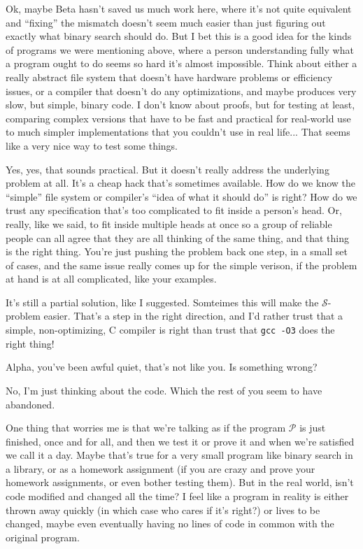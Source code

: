 \documentclass[sigplan]{acmart}
\begin{document}
  Ok, maybe Beta hasn't saved us much
work here, where it's not quite equivalent and ``fixing'' the mismatch
doesn't seem much easier than just figuring out exactly what binary
search should do.  But I bet this is a good idea for the kinds of
programs we were mentioning above, where a person understanding fully
what a program ought to do seems so hard it's almost impossible.
Think about either a really abstract file system that doesn't have
hardware problems or efficiency issues, or a compiler that doesn't do
any optimizations, and maybe produces very slow, but simple, binary
code.  I don't know about proofs, but for testing at least, comparing
complex versions that have to be fast and practical for real-world use
to much simpler implementations that you couldn't use in real life...
That seems like a very nice way to test some things.

  Yes, yes, that sounds practical.  But it
doesn't really address the underlying problem at all.  It's a cheap
hack that's sometimes available. How do we know the ``simple''
file system or compiler's ``idea of what it should do'' is right?  How
do we trust any specification that's too complicated to fit inside a
person's head.  Or, really, like we said, to fit inside multiple heads
at once so a group of reliable people can all agree that they are all
thinking of the same thing, and that thing is the right thing.  You're
just pushing the problem back one step, in a small set of cases, and
the same issue really comes up for the simple verison, if the problem
at hand is at all complicated, like your examples.

   It's still a partial solution, like I
suggested. Somteimes this will make the $\mathcal{S}$-problem easier.
That's a step in the right direction, and I'd rather trust that a
simple, non-optimizing, C compiler is right than trust that {\tt gcc
  -O3} does the right thing!

  Alpha, you've been awful quiet, that's not
like you. Is something wrong?

  No, I'm just thinking about the code.
Which the rest of you seem to have abandoned.

  One thing that worries me is that we're
talking as if the program  $\mathcal{P}$ is just finished, once and
for all, and then we test it or prove it and when we're satisfied we
call it a day.  Maybe that's true for a very small program like binary
search in a library, or as a homework assignment (if you are crazy and
prove your homework assignments, or even bother testing them).  But in
the real world, isn't code modified and changed all the time?  I feel
like a program in reality is either thrown away quickly (in which case
who cares if it's right?) or lives to be changed, maybe even
eventually having no lines of code in common with the original program.
\end{document}
